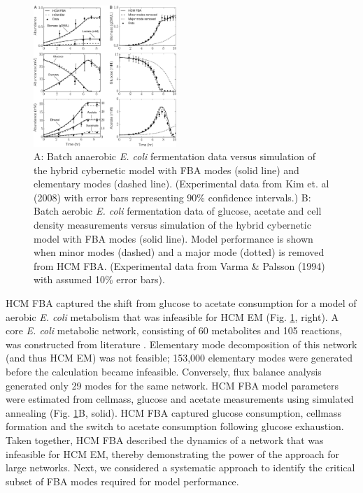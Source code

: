 \documentclass[10pt,twocolumn,twoside,final]{IEEEtran}
\begin{document}
\begin{figure}[!t]\centering
\includegraphics[width=0.48\textwidth]{./figs/Fig-2-Ecoli-SimulationResults.pdf}
\caption{A: Batch anaerobic \textit{E. coli} fermentation data versus simulation of the hybrid cybernetic model with FBA modes (solid line) and elementary modes (dashed line). (Experimental data from Kim et. al (2008)\cite{2008_kim_varner_ramkrishna_BiotechProg} with error bars representing 90\% confidence intervals.) B: Batch aerobic \textit{E. coli} fermentation data of glucose, acetate and cell density measurements versus simulation of the hybrid cybernetic model with FBA modes (solid line). Model performance is shown when minor modes (dashed) and a major mode (dotted) is removed from HCM FBA. (Experimental data from Varma \& Palsson (1994)\cite{1994_varma_palsson_ApplEnvMicro} with assumed 10\% error bars).}
\label{fig:ecoli}
\end{figure}

HCM FBA captured the shift from glucose to acetate consumption for a model of aerobic \textit{E. coli} metabolism that was infeasible for HCM EM (Fig. \ref{fig:ecoli}, right).
A core \emph{E. coli} metabolic network, consisting of 60 metabolites and 105 reactions, was constructed from literature \cite{2007_schuetz_etal_MolSysBio,2006_Palsson_model}.
Elementary mode decomposition of this network (and thus HCM EM) was not feasible; 153,000 elementary modes were generated before the calculation became infeasible.
Conversely, flux balance analysis generated only 29 modes for the same network.
HCM FBA model parameters were estimated from cellmass, glucose and acetate measurements \cite{1994_varma_palsson_ApplEnvMicro} using simulated annealing (Fig. \ref{fig:ecoli}B, solid).
HCM FBA captured glucose consumption, cellmass formation and the switch to acetate consumption following glucose exhaustion.
Taken together, HCM FBA described the dynamics of a network that was infeasible for HCM EM, thereby demonstrating the power of the approach for large networks.
Next, we considered a systematic approach to identify the critical subset of FBA modes required for model performance.
\end{document}

